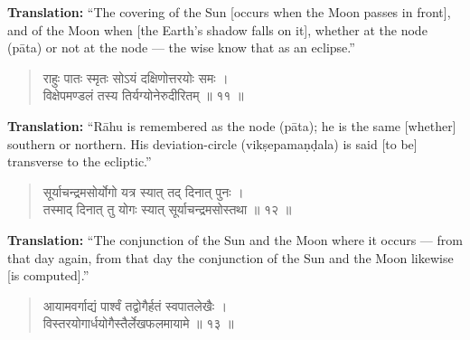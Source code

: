 \documentclass[11pt,a4paper]{article}
\newcommand{\dev}[1]{{\devanagarifont #1}}
\newenvironment{sanskritverse}{\begin{verse}\devanagarifont\large\centering}{\end{verse}}
\begin{document}
\vspace{0.3cm}
\noindent\textbf{Translation:} ``The covering of the Sun [occurs when the Moon passes in front], and of the Moon when [the Earth's shadow falls on it], whether at the node (pāta) or not at the node --- the wise know that as an eclipse.''

\vspace{0.5cm}

\begin{tcolorbox}[colback=white,colframe=rulecolor,title={\dev{\textbf{गोल ११ — पातसंज्ञा (The Nodes)}}}]
\begin{sanskritverse}
\dev{राहुः पातः स्मृतः सोऽयं दक्षिणोत्तरयोः समः ।\\
विक्षेपमण्डलं तस्य तिर्यग्योनेरुदीरितम् ॥ ११ ॥}
\end{sanskritverse}
\end{tcolorbox}

\vspace{0.3cm}
\noindent\textbf{Translation:} ``Rāhu is remembered as the node (pāta); he is the same [whether] southern or northern. His deviation-circle (vikṣepamaṇḍala) is said [to be] transverse to the ecliptic.''

\vspace{0.5cm}

\begin{tcolorbox}[colback=white,colframe=rulecolor,title={\dev{\textbf{गोल १२ — योगनिर्णयः (Conjunction of Planets)}}}]
\begin{sanskritverse}
\dev{सूर्याचन्द्रमसोर्योगो यत्र स्यात् तद् दिनात् पुनः ।\\
तस्माद् दिनात् तु योगः स्यात् सूर्याचन्द्रमसोस्तथा ॥ १२ ॥}
\end{sanskritverse}
\end{tcolorbox}

\vspace{0.3cm}
\noindent\textbf{Translation:} ``The conjunction of the Sun and the Moon where it occurs --- from that day again, from that day the conjunction of the Sun and the Moon likewise [is computed].''

\vspace{0.5cm}

\begin{tcolorbox}[colback=white,colframe=rulecolor,title={\dev{\textbf{गोल १३ — अक्षज्या (Sine of Latitude)}}}]
\begin{sanskritverse}
\dev{आयामवर्गाद्यं पार्श्वं तद्वोगैर्हतं स्वपातलेखैः ।\\
विस्तरयोगार्धयोगैस्तैर्लेखफलमायामे ॥ १३ ॥}
\end{sanskritverse}
\end{tcolorbox}
\end{document}
